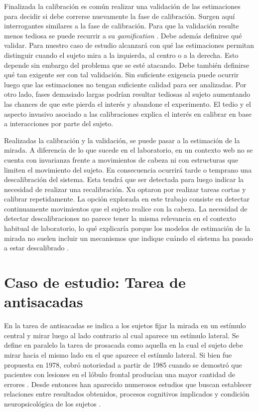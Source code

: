 Finalizada la calibración es común realizar una validación de las estimaciones
para decidir si debe correrse nuevamente la fase de calibración.
Surgen aquí interrogantes similares a la fase de calibración.
Para que la validación resulte menos tediosa se puede recurrir a su
\textit{gamification} \cite{xu_2015_turker_gaze}.
Debe además definirse qué validar.
Para nuestro caso de estudio alcanzará con qué las estimaciones permitan
distinguir cuando el sujeto mira a la izquierda, al centro o a la derecha.
Esto depende sin embargo del problema que se esté atacando.
Debe también definirse qué tan exigente ser con tal validación.
Sin suficiente exigencia puede ocurrir luego que las estimaciones no tengan
suficiente calidad para ser analizadas.
Por otro lado, fases demasiado largas podrían resultar tediosas al sujeto
aumentando las chances de que este pierda el interés y abandone el experimento.
El tedio y el aspecto invasivo asociado a las calibraciones explica el interés
en calibrar en base a interacciones por parte del sujeto.

Realizadas la calibración y la validación, se puede pasar a la estimación de la
mirada.
A diferencia de lo que sucede en el laboratorio, en un contexto web no se cuenta
con invarianza frente a movimientos de cabeza ni con estructuras que limiten el
movimiento del sujeto.
En consecuencia ocurrirá tarde o temprano una descalibración del sistema.
Esta tendrá que ser detectada para luego indicar la necesidad de realizar una
recalibración.
Xu \etal \cite{xu_2015_turker_gaze} optaron por realizar tareas cortas y
calibrar repetidamente.
La opción explorada en este trabajo consiste en detectar continuamente
movimientos que el sujeto realice con la cabeza.
La necesidad de detectar descalibraciones no parece tener la misma relevancia en
el contexto habitual de laboratorio, lo qué explicaría porque los modelos de estimación de la
mirada no suelen incluir un mecanismos que indique cuándo el sistema ha pasado
a estar descalibrado \cite{hansen_2009_eye_of_the_beholder}.

\section{Caso de estudio: Tarea de antisacadas}

En la tarea de antisacadas se indica a los sujetos fijar la mirada en un estímulo
central y mirar luego al lado contrario al cual aparece un estímulo lateral.
Se define en paralelo la tarea de prosacada como aquella en la cual el sujeto
debe mirar hacia el mismo lado en el que aparece el estímulo lateral.
Si bien fue propuesta en 1978, cobró notoriedad a partir de 1985 cuando se
demostró que pacientes con lesiones en el lóbulo frontal producían una mayor
cantidad de errores \cite{smyrnis_2002_big_sample}.
Desde entonces han aparecido numerosos estudios que buscan establecer
relaciones entre resultados obtenidos, procesos cognitivos implicados y
condición neuropsicológica de los sujetos \cite{munoz_2004_look_away,
unsworth_2011_distribution_analysis, olincy_1997_age_diminishes_performance,
smyrnis_2002_big_sample, unsworth_2021_working_memory_capacity,
plomecka_2020_retest_reliability}.

